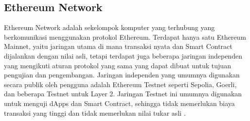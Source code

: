 \subsection{Ethereum Network}
\label{subsec:ethereum-network}

Ethereum Network adalah sekelompok komputer yang terhubung yang berkomunikasi menggunakan protokol Ethereum. Terdapat hanya satu Ethereum Mainnet, yaitu jaringan utama di mana transaksi nyata dan Smart Contract dijalankan dengan nilai asli, tetapi terdapat juga beberapa jaringan independen yang mengikuti aturan protokol yang sama yang dapat dibuat untuk tujuan pengujian dan pengembangan. Jaringan independen yang umumnya digunakan secara publik oleh pengguna adalah Ethereum Testnet seperti Sepolia, Goerli, dan beberapa Testnet untuk Layer 2. Jaringan Testnet ini umumnya digunakan untuk menguji dApps dan Smart Contract, sehingga tidak memerlukan biaya transaksi yang tinggi dan tidak memerlukan nilai tukar asli \parencite{ethereum_networks}.